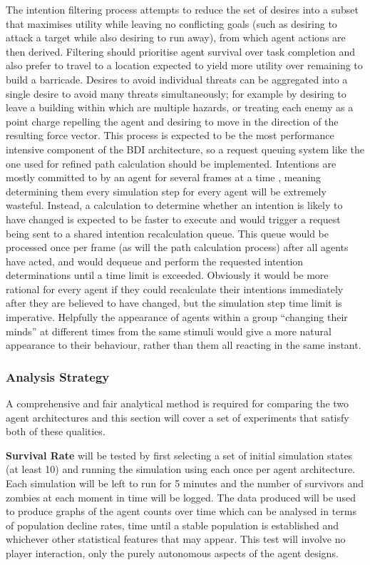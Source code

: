 \documentclass[12pt,a4paper]{article}
\begin{document}
The intention filtering process attempts to reduce the set of desires into a subset that maximises utility while leaving no conflicting goals (such as desiring to attack a target while also desiring to run away), from which agent actions are then derived. Filtering should prioritise agent survival over task completion and also prefer to travel to a location expected to yield more utility over remaining to build a barricade. Desires to avoid individual threats can be aggregated into a single desire to avoid many threats simultaneously; for example by desiring to leave a building within which are multiple hazards, or treating each enemy as a point charge repelling the agent and desiring to move in the direction of the resulting force vector. This process is expected to be the most performance intensive component of the BDI architecture, so a request queuing system like the one used for refined path calculation should be implemented. Intentions are mostly committed to by an agent for several frames at a time \cite{bonura09}, meaning determining them every simulation step for every agent will be extremely wasteful. Instead, a calculation to determine whether an intention is likely to have changed is expected to be faster to execute and would trigger a request being sent to a shared intention recalculation queue. This queue would be processed once per frame (as will the path calculation process) after all agents have acted, and would dequeue and perform the requested intention determinations until a time limit is exceeded. Obviously it would be more rational for every agent if they could recalculate their intentions immediately after they are believed to have changed, but the simulation step time limit is imperative. Helpfully the appearance of agents within a group ``changing their minds'' at different times from the same stimuli would give a more natural appearance to their behaviour, rather than them all reacting in the same instant.

\subsubsection{Analysis Strategy}\noindent
A comprehensive and fair analytical method is required for comparing the two agent architectures and this section will cover a set of experiments that satisfy both of these qualities.

\textbf{Survival Rate} will be tested by first selecting a set of initial simulation states (at least 10) and running the simulation using each once per agent architecture. Each simulation will be left to run for 5 minutes and the number of survivors and zombies at each moment in time will be logged. The data produced will be used to produce graphs of the agent counts over time which can be analysed in terms of population decline rates, time until a stable population is established and whichever other statistical features that may appear. This test will involve no player interaction, only the purely autonomous aspects of the agent designs.
\end{document}

